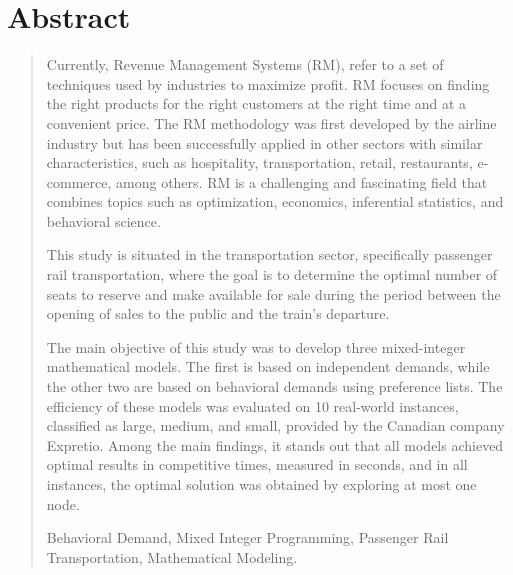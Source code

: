 \chapter*{Abstract}

\vspace{-1.0cm}
\begin{quotation}

Currently, Revenue Management Systems (RM), refer to a set of techniques used by industries to maximize profit. RM focuses on finding the right products for the right customers at the right time and at a convenient price. The RM methodology was first developed by the airline industry but has been successfully applied in other sectors with similar characteristics, such as hospitality, transportation, retail, restaurants, e-commerce, among others. RM is a challenging and fascinating field that combines topics such as optimization, economics, inferential statistics, and behavioral science.

This study is situated in the transportation sector, specifically passenger rail transportation, where the goal is to determine the optimal number of seats to reserve and make available for sale during the period between the opening of sales to the public and the train's departure.

The main objective of this study was to develop three mixed-integer mathematical models. The first is based on independent demands, while the other two are based on behavioral demands using preference lists. The efficiency of these models was evaluated on 10 real-world instances, classified as large, medium, and small, provided by the Canadian company Expretio. Among the main findings, it stands out that all models achieved optimal results in competitive times, measured in seconds, and in all instances, the optimal solution was obtained by exploring at most one node.

\vspace{0.5cm}

 Behavioral Demand, Mixed Integer Programming, Passenger Rail Transportation, Mathematical Modeling.

\end{quotation}